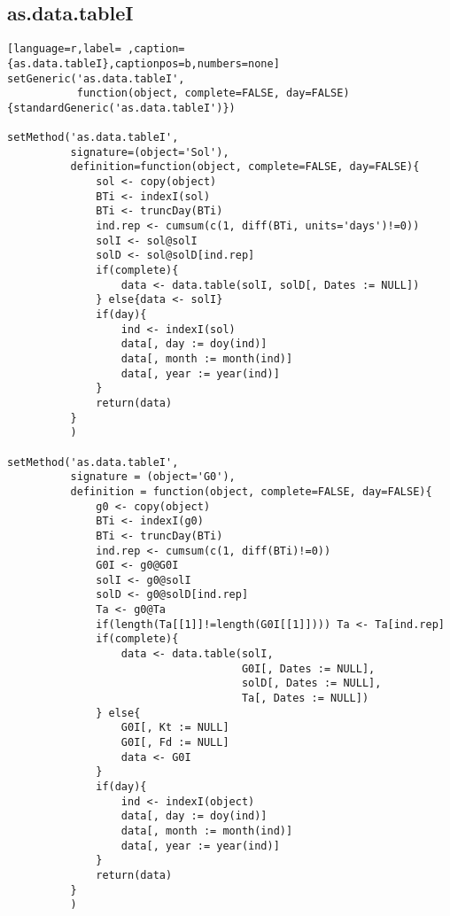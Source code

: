 \subsection{as.data.tableI}
\label{sec:org2eb8e02}
\label{subsec:as.data.tablei}
\begin{lstlisting}[language=r,label= ,caption={as.data.tableI},captionpos=b,numbers=none]
setGeneric('as.data.tableI',
           function(object, complete=FALSE, day=FALSE){standardGeneric('as.data.tableI')})

setMethod('as.data.tableI',
          signature=(object='Sol'),
          definition=function(object, complete=FALSE, day=FALSE){
              sol <- copy(object)
              BTi <- indexI(sol)
              BTi <- truncDay(BTi)
              ind.rep <- cumsum(c(1, diff(BTi, units='days')!=0))
              solI <- sol@solI
              solD <- sol@solD[ind.rep]
              if(complete){
                  data <- data.table(solI, solD[, Dates := NULL])
              } else{data <- solI}
              if(day){
                  ind <- indexI(sol)
                  data[, day := doy(ind)]
                  data[, month := month(ind)]
                  data[, year := year(ind)]
              }
              return(data)
          }
          )

setMethod('as.data.tableI',
          signature = (object='G0'),
          definition = function(object, complete=FALSE, day=FALSE){
              g0 <- copy(object)
              BTi <- indexI(g0)
              BTi <- truncDay(BTi)
              ind.rep <- cumsum(c(1, diff(BTi)!=0))
              G0I <- g0@G0I
              solI <- g0@solI
              solD <- g0@solD[ind.rep]
              Ta <- g0@Ta
              if(length(Ta[[1]]!=length(G0I[[1]]))) Ta <- Ta[ind.rep]
              if(complete){
                  data <- data.table(solI,
                                     G0I[, Dates := NULL],
                                     solD[, Dates := NULL],
                                     Ta[, Dates := NULL])
              } else{    
                  G0I[, Kt := NULL]
                  G0I[, Fd := NULL]
                  data <- G0I
              }
              if(day){
                  ind <- indexI(object)
                  data[, day := doy(ind)]
                  data[, month := month(ind)]
                  data[, year := year(ind)]
              }
              return(data)
          }
          )


\end{lstlisting}
